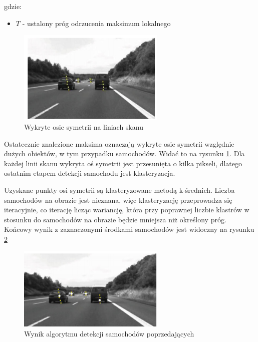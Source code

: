 gdzie:
\begin{itemize}
\item $T$ - ustalony próg odrzucenia maksimum lokalnego
\end{itemize}


\begin{figure}
  \centering
  \includegraphics[width=7cm]{img/car_symmetry.png}
  \caption{Wykryte osie symetrii na liniach skanu\cite{T1}}
  \label{fig:car_detected}
\end{figure}

Ostatecznie znalezione maksima oznaczają wykryte osie symetrii względnie dużych obiektów, w tym przypadku samochodów. 
Widać to na rysunku \ref{fig:car_detected}. 
Dla każdej linii skanu wykryta oś symetrii jest przesunięta o kilka pikseli, dlatego ostatnim etapem detekcji samochodu jest klasteryzacja.

Uzyskane punkty osi symetrii są klasteryzowane metodą k-średnich. 
Liczba samochodów na obrazie jest nieznana, więc klasteryzację przeprowadza się iteracyjnie, co iterację licząc wariancję, która przy poprawnej liczbie klastrów w stosunku do samochodów na obrazie będzie mniejsza niż określony próg. 
Końcowy wynik z zaznaczonymi środkami samochodów jest widoczny na rysunku \ref{fig:car_end}

\begin{figure}
  \centering
  \includegraphics[width=7cm]{img/car_end.png}
  \caption{Wynik algorytmu detekcji samochodów poprzedających\cite{T1}}
  \label{fig:car_end}
\end{figure}


